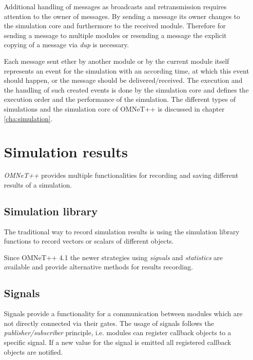 Additional handling of messages as broadcasts and retransmission requires attention to the owner of messages.
By sending a message its owner changes to the simulation core and furthermore to the received module.
Therefore for sending a message to multiple modules or resending a message the explicit copying of a message via \emph{dup} is necessary. \cite[section 4.7.3]{omnet_manual}


Each message sent ether by another module or by the current module itself represents an event for the simulation with an according time, at which this event should happen, or the message should be delivered/received.
The execution and the handling of such created events is done by the simulation core and defines the execution order and the performance of the simulation.
The different types of simulations and the simulation core of OMNeT++ is discussed in chapter \ref{cha:simulation}.
\section{Simulation results}
\label{sec:omnet_results}
\emph{OMNeT++} provides multiple functionalities for recording and saving different results of a simulation.


\subsection{Simulation library}
\label{sec:omnet_results_sim_lib}
The traditional way to record simulation results is using the simulation library functions to record vectors or scalars of different objects.

Since OMNeT++ 4.1 the newer strategies using \emph{signals} and \emph{statistics} are available and provide alternative methods for results recording.

\subsection{Signals}
\label{sec:omnet_results_signals}
Signals provide a functionality for a communication between modules which are not directly connected via their gates.
The usage of signals follows the \emph{publisher/subscriber} principle, i.e. modules can register callback objects to a specific signal.
If a new value for the signal is emitted all registered callback objects are notified.

